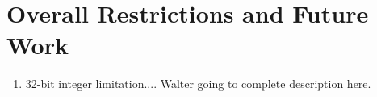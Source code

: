
\section{Overall Restrictions and Future Work}
\label{sec:overallrest}

\begin{enumerate}

\item 32-bit integer limitation.... Walter going to complete description here.

\end{enumerate}
